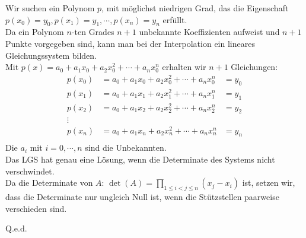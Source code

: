 	Wir suchen ein Polynom $p$, mit möglichst niedrigen Grad, das die Eigenschaft $p(x_0)=y_0,p(x_1)=y_1, \cdots,p(x_n)=y_n$ erfüllt.\\
	Da ein Polynom $n$-ten Grades $n+1$ unbekannte Koeffizienten aufweist und $n+1$ Punkte vorgegeben sind, kann man bei der Interpolation ein lineares Gleichungssystem bilden.\\
	Mit $p(x) = a_0+a_1x_0+a_2x_0^2+ \cdots + a_nx_0^n$ erhalten wir $n+1$ Gleichungen:
	\begin{align*}
	p(x_0) &= a_0+a_1x_0+a_2x_0^2+ \cdots + a_nx_0^n &= y_0\\
	p(x_1) &= a_0+a_1x_1+a_2x_1^2+ \cdots + a_nx_1^n &= y_1\\
	p(x_2) &= a_0+a_1x_2+a_2x_2^2+ \cdots + a_nx_2^n &= y_2\\
	\vdots\\
	p(x_n) &= a_0+a_1x_n+a_2x_n^2+ \cdots + a_nx_n^n &= y_n\\
	\end{align*}
	Die $a_i$ mit $i=0,\cdots,n$ sind die Unbekannten.\\
	Das LGS hat genau eine Lösung, wenn die Determinate des Systems nicht verschwindet.\\
	Da die Determinate von $A$: $\det(A)=\prod \limits_{1 \leq i < j \leq n}(x_j-x_i)$ ist, setzen wir, dass die Determinate nur ungleich Null ist, wenn die Stützstellen paarweise verschieden sind.
	\begin{flushright}
		Q.e.d.
	\end{flushright}



